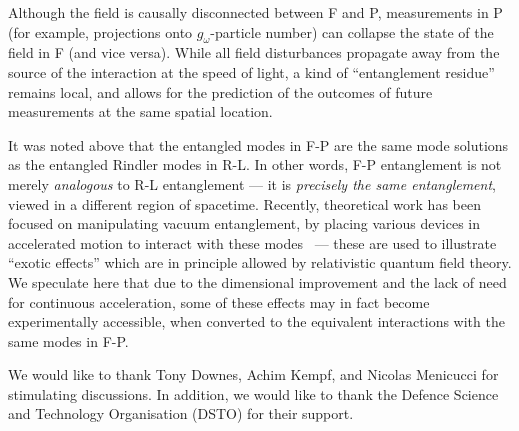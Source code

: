 \documentclass[aps,prl,showpacs,12pt]{revtex4}
\begin{document}
Although the field is causally disconnected between F and P, measurements in P (for example, projections onto $g_{\omega}$-particle number) can collapse the state of the field in F (and vice versa).  While all field disturbances propagate away from the source of the interaction at the speed of light, a kind of ``entanglement residue'' remains local, and allows for the prediction of the outcomes of future measurements at the same spatial location.

It was noted above that the entangled modes in F-P are the same mode solutions as the entangled Rindler modes in R-L.  In other words, F-P entanglement is not merely \emph{analogous} to R-L entanglement \---- it is \emph{precisely the same entanglement}, viewed in a different region of spacetime.  Recently, theoretical work has been focused on manipulating vacuum entanglement, by placing various devices in accelerated motion to interact with these modes~\cite{alsing1, bradler1, reznik1, mann1, lin1, han1} \---- these are used to illustrate ``exotic effects'' which are in principle allowed by relativistic quantum field theory.  We speculate here that due to the dimensional improvement and the lack of need for continuous acceleration, some of these effects may in fact become experimentally accessible, when converted to the equivalent interactions with the same modes in F-P.

We would like to thank Tony Downes, Achim Kempf, and Nicolas Menicucci for stimulating discussions.  In addition, we would like to thank the Defence Science and Technology Organisation (DSTO) for their support.

{}

 
\end{document}
